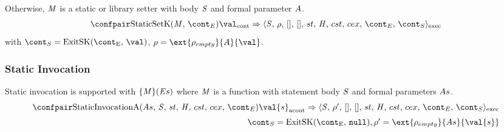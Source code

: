 \documentclass{article}
\newcommand{\cesktrans}[2]{\ensuremath{{#1} \Rightarrow {#2}}}
\begin{document}
\noindent
Otherwise, $\mathit{M}$ is a static or library setter with body $\mathit{S}$ and formal parameter $A$.
\[
  \begin{array}{lcl}
	\cesktrans{
		\contconf{\StaticSetK}{\val}}{
		\execconf{\stmt}{\env}{[]}{[]}{\handler}{\cstrace}{\cex}{\econt}{\scont}}
  \end{array}
\]
with $\scont = \ExitSK{\val}$, $\env = \ext{\env_{empty}}{\formal}{\val}$.

\subsubsection{Static Invocation}
Static invocation is supported with $\{\mathit{M}\}(\mathit{E}{s})$ where $\mathit{M}$ is a function with statement body $\mathit{S}$ and formal parameters $As$.
\[
  \begin{array}{rcl}
	\cesktrans{
		\acontconf{\StaticInvA{\formals}{\stmt}{\strace}{\econt}}{\val{s}}}{
		\execconf{\stmt}{\env'}{[]}{[]}{\handler}{\cstrace}{\cex}{\econt}{\scont}}
	\\[2mm]
	\scont = \ExitSK{\tt{null}},
	\env' = \ext{\env_{empty}}{\formals}{\val{s}}\\[2mm]
  \end{array}
\]
\end{document}
